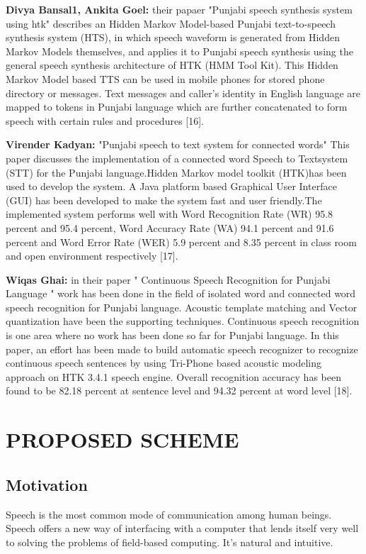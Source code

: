 \documentclass[12pt,a4paper,oneside]{memoir}
\begin{document}
\textbf{Divya Bansal1, Ankita Goel:} their papaer "Punjabi speech synthesis system using htk" describes an Hidden Markov Model-based Punjabi text-to-speech synthesis system (HTS), in
which speech waveform is generated from Hidden Markov Models themselves, and applies it to Punjabi
speech synthesis using the general speech synthesis architecture of HTK (HMM Tool Kit). This Hidden
Markov Model based TTS can be used in mobile phones for stored phone directory or messages. Text
messages and caller’s identity in English language are mapped to tokens in Punjabi language which are
further concatenated to form speech with certain rules and procedures [16]. 

\textbf{Virender Kadyan:} "Punjabi speech to text system for connected words" This paper
discusses the implementation of a connected word
Speech to Textsystem (STT) for the Punjabi
language.Hidden Markov model toolkit (HTK)has been
used to develop the system. A Java platform based
Graphical User Interface (GUI) has been developed to
make the system fast and user friendly.The implemented
system performs well with Word Recognition Rate
(WR) 95.8 percent and 95.4 percent, Word Accuracy Rate (WA)
94.1 percent and 91.6 percent and Word Error Rate (WER) 5.9 percent
and 8.35 percent in class room and open environment
respectively [17]. 

\textbf{Wiqas Ghai:} in their paper " Continuous Speech Recognition for Punjabi Language " work has been
done in the field of isolated word and connected word
speech recognition for Punjabi language. Acoustic template
matching and Vector quantization have been the supporting
techniques. Continuous speech recognition is one area where
no work has been done so far for Punjabi language. In this
paper, an effort has been made to build automatic speech
recognizer to recognize continuous speech sentences by
using Tri-Phone based acoustic modeling approach on HTK
3.4.1 speech engine. Overall recognition accuracy has
been found to be 82.18 percent at sentence level and 94.32 percent
at word level [18].




\chapter{PROPOSED SCHEME}
\section{Motivation}
Speech is the most common mode of communication among human beings. Speech
offers a new way of interfacing with a computer that lends itself very well to solving
the problems of field-based computing. It's natural and intuitive. 
\end{document}
